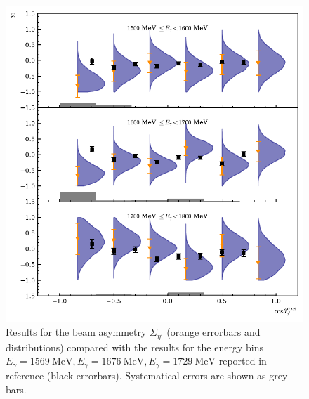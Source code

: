 \begin{figure}[htbp]
	\centering
	\includegraphics[width=\linewidth]{../bayes/etap_event_based_fit/plots/sigma_etap_data.pdf}
	\caption{Results for the beam asymmetry $\Sigma_{\eta'}$ (orange errorbars and distributions) compared with the results for the energy bins $E_\gamma=\SI{1569}{\mega\eV},E_\gamma=\SI{1676}{\mega\eV},E_\gamma=\SI{1729}{\mega\eV}$ reported in reference \cite{collins} (black errorbars).   Systematical errors are shown as grey bars.}
	\label{fig:etapcollins}
\end{figure}
